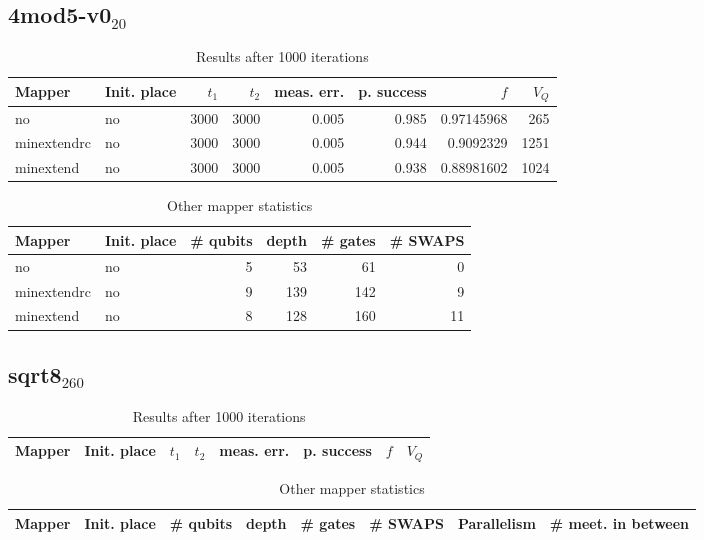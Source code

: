 \documentclass[11pt]{article}
\begin{document}
\subsection{4mod5-v0\(_{\text{20}}\)}
\label{sec:orgd34770c}
\begin{table}[!htpb]
\caption{\label{tab:org6164a0e}
Results after 1000 iterations}
\centering
\begin{tabular}{llrrrrrr}
\hline
Mapper & Init. place & \(t_1\) & \(t_2\) & meas. err. & p. success & \(f\) & \(V_Q\)\\
\hline
no & no & 3000 & 3000 & 0.005 & 0.985 & 0.97145968 & 265\\
\hline
minextendrc & no & 3000 & 3000 & 0.005 & 0.944 & 0.9092329 & 1251\\
minextend & no & 3000 & 3000 & 0.005 & 0.938 & 0.88981602 & 1024\\
\hline
\end{tabular}
\end{table}

\begin{table}[!htpb]
\caption{\label{tab:org593f7e5}
Other mapper statistics}
\centering
\small
\begin{tabular}{llrrrr}
\hline
Mapper & Init. place & \# qubits & depth & \# gates & \# SWAPS\\
\hline
no & no & 5 & 53 & 61 & 0\\
\hline
minextendrc & no & 9 & 139 & 142 & 9\\
minextend & no & 8 & 128 & 160 & 11\\
\hline
\end{tabular}
\end{table}
\subsection{sqrt8\(_{\text{260}}\)}
\label{sec:org3694e2b}
\begin{table}[!htpb]
\caption{\label{tab:org5aa3063}
Results after 1000 iterations}
\centering
\begin{tabular}{llllllll}
\hline
Mapper & Init. place & \(t_1\) & \(t_2\) & meas. err. & p. success & \(f\) & \(V_Q\)\\
\hline
\end{tabular}
\end{table}

\begin{table}[!htpb]
\caption{\label{tab:orgef90512}
Other mapper statistics}
\centering
\small
\begin{tabular}{llllllll}
\hline
Mapper & Init. place & \# qubits & depth & \# gates & \# SWAPS & Parallelism & \# meet. in between\\
\hline
\end{tabular}
\end{table}
\end{document}
